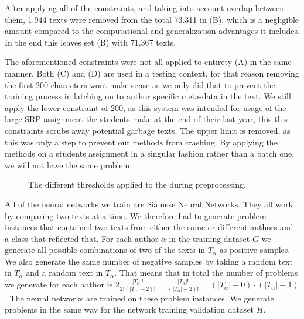 After applying all of the constraints, and taking into account
overlap between them, 1.944 texts were removed from the total 73.311 in (B),
which is a negligible amount compared to the computational and generalization
advantages it includes.
In the end this leaves set (B) with 71.367 texts.

The aforementioned constraints were not all applied to entirety (A) in the same
manner. Both (C) and (D) are used in a testing context, for that reason removing
the first 200 characters wont make sense as we only did that to prevent the
training process in latching on to author specific meta-data in the text. We
still apply the lower constraint of 200, as this system was intended for usage
of the large SRP assignment the students make at the end of their last year,
this this constraints scrubs away potential garbage texts. The upper limit
is removed, as this was only a step to prevent our methods from crashing. By
applying the methods on a students assignment in a singular fashion rather than
a batch one, we will not have the same problem.

\begin{figure}[htb]
    \begin{minipage}{.5\linewidth}
        \centering
    \end{minipage}%
    \begin{minipage}{.5\linewidth}
        \centering
    \end{minipage}\par\medskip
    \centering

    \caption{The different thresholds applied to the during preprocessing.}
    \label{fig:character_frequencies}
\end{figure}

All of the neural networks we train are Siamese Neural Networks. They all
work by comparing two texts at a time. We therefore had to generate problem
instances that contained two texts from either the same or different authors and
a class that reflected that. For each author $\alpha$ in the training dataset
$G$ we generate all possible combinations of two of the texts in $T_\alpha$
as positive samples. We also generate the same number of negative samples by
taking a random text in $T_\alpha$ and a random text in $\overline{T_\alpha}$.
That means that in total the number of problems we generate for each
author is $2\frac{\left|T_\alpha\right|!}{2!(\left|T_\alpha\right|-2)!}
= \frac{\left|T_\alpha\right|!}{(\left|T_\alpha\right|-2)!} =
(\left|T_\alpha\right| - 0) \cdot (\left|T_\alpha\right| - 1) $. The neural
networks are trained on these problem instances. We generate problems in the
same way for the network training validation dataset $H$.
